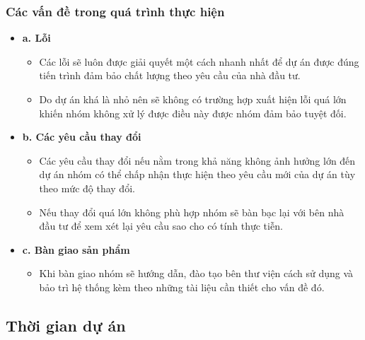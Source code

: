 \documentclass[12pt]{article}
\begin{document}
\subsubsection{Các vấn đề trong quá trình thực hiện}
\begin{itemize}[label=]
    \item \textbf{a. Lỗi}
        \begin{itemize}[label=-, leftmargin=1cm]
        \item Các lỗi sẽ luôn được giải quyết một cách nhanh nhất để dự án được đúng tiến trình đảm bảo chất lượng theo yêu cầu của nhà đầu tư.
        \item Do dự án khá là nhỏ nên sẽ không có trường hợp xuất hiện lỗi quá lớn khiến nhóm không xử lý được điều này được nhóm đảm bảo tuyệt đối.
        \end{itemize}
    \item \textbf{b. Các yêu cầu thay đổi}
        \begin{itemize}[label=-, leftmargin=1cm]
        \item Các yêu cầu thay đổi nếu nằm trong khả năng không ảnh hưởng lớn đến dự án nhóm có thể chấp nhận thực hiện theo yêu cầu mới của dự án tùy theo mức độ thay đổi.
        \item Nếu thay đổi quá lớn không phù hợp nhóm sẽ bàn bạc lại với bên nhà đầu tư để xem xét lại yêu cầu sao cho có tính thực tiễn.
        \end{itemize}
    \item \textbf{c. Bàn giao sản phẩm}
        \begin{itemize}[label=-, leftmargin=1cm]
        \item Khi bàn giao nhóm sẽ hướng dẫn, đào tạo bên thư viện cách sử dụng và bảo trì hệ thống kèm theo những tài liệu cần thiết cho vấn đề đó.
        \end{itemize}
\end{itemize}

\subsection{Thời gian dự án}
\end{document}
